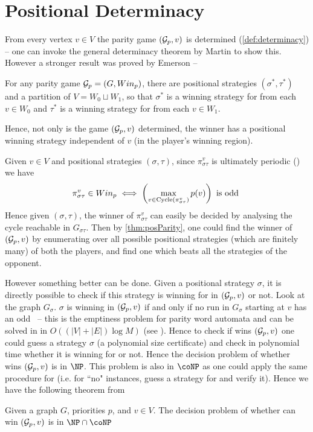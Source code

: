 \section{Positional Determinacy}
From every vertex $v \in V$ the parity game $(\mathcal{G}_p,v)$ is determined (\autoref{def:determinacy}) -- one can invoke the general determinacy theorem by Martin \cite{martin_borel_1975}  to show this. However a stronger result was proved by Emerson \cite{emerson_automata_1985} --\\


\begin{theorem}
    \label{thm:posParity}
    For any parity game $\mathcal{G}_p=(G,Win_p)$, there are positional strategies $(\sigma^*,\tau^*)$ and a partition of $V = W_0 \sqcup W_1$, so that $\sigma^*$ is a winning strategy for  from each $v \in W_0$ and $\tau^*$ is a winning strategy for  from each $v \in W_1$.
\end{theorem}
Hence, not only is the game $(\mathcal{G}_p,v)$ determined, the winner has a positional winning strategy independent of $v$ (in the player's winning region).

Given $v \in V$ and positional strategies $(\sigma,\tau)$, since $\pi^{v}_{\sigma\tau}$ is ultimately periodic () we have 
\[
    \pi^{v}_{\sigma\tau} \in Win_p \iff \left( \max_{v \in \operatorname{Cycle}(\pi^v_{\sigma\tau})} p(v)\right) \text{ is odd }
\]
Hence given $(\sigma,\tau)$, the winner of $\pi^v_{\sigma\tau}$ can easily be decided by analysing the cycle reachable in $G_{\sigma\tau}$.  Then by \autoref{thm:posParity}, one could find the winner of $(\mathcal{G}_p,v)$ by enumerating over all possible positional strategies (which are finitely many) of both the players, and find one which beats all the strategies of the opponent. 

However something better can be done. Given a positional strategy $\sigma$, it is directly possible to check if this strategy is winning for  in $(\mathcal{G}_p,v)$ or not. Look at the graph $G_\sigma$. $\sigma$ is winning in $(\mathcal{G}_p,v)$ if and only if no run in $G_\sigma$ starting at $v$ has an odd \mip\ -- this is the emptiness problem for parity word automata and can be solved in in $O\left((|V|+|E|) \log M\right)$ (see \cite{king_complexity_2001}). Hence to check if  wins $(\mathcal{G}_p,v)$ one could guess a strategy $\sigma$ (a polynomial size certificate) and check in polynomial time whether it is winning for  or not. Hence the decision problem of whether  wins $(\mathcal{G}_p,v)$ is in $\NP$. This problem is also in $\coNP$ as one could apply the same procedure for  (i.e. for ``no" instances, guess a strategy for  and verify it). Hence we have the following theorem from \cite{thomas2002automata}\\
\begin{theorem}
    \label{thm:np}
    Given a graph $G$, priorities $p$, and $v \in V$. The decision problem of whether  can win $(\mathcal{G}_p,v)$ is in $\NP \cap \coNP$
\end{theorem}

